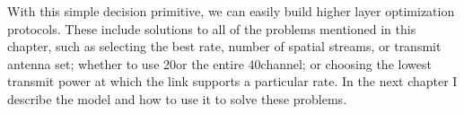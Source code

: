 With this simple decision primitive, we can easily build higher layer optimization protocols. These include solutions to all of the problems mentioned in this chapter, such as selecting the best rate, number of spatial streams, or transmit antenna set; whether to use 20\MHz or the entire 40\MHz channel; or choosing the lowest transmit power at which the link supports a particular rate. In the next chapter I describe the model and how to use it to solve these problems.




\ifx\mainfile\undefined

\fi
